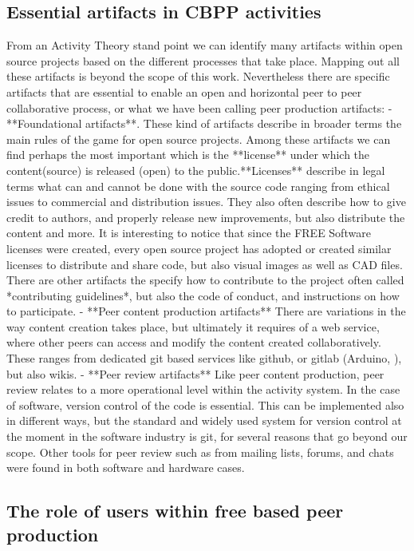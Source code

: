 \documentclass{ICED-Paper}%
\begin{document}
\subsection{Essential artifacts in CBPP activities}
From an Activity Theory stand point we can identify many artifacts within open source projects based on the different processes that take place. Mapping out all these artifacts is beyond the scope of this work. Nevertheless there are specific artifacts that are essential to enable an open and horizontal peer to peer collaborative process, or what we have been calling peer production artifacts:
- **Foundational artifacts**. These kind of artifacts describe in broader terms the main rules of the game for open source projects. Among these artifacts we can find perhaps the most important which is the **license** under which the content(source) is released (open) to the public.**Licenses** describe in legal terms what can and cannot be done with the source code ranging from ethical issues to commercial and distribution issues. They also often describe how to give credit to authors, and properly
release new improvements, but also distribute the content and more. It is interesting to notice that since the FREE Software licenses were created, every open source project has adopted or created similar licenses to distribute and share code, but also visual images as well as CAD files. There are other artifacts the specify how to contribute to the project often called *contributing guidelines*, but also the code of conduct, and instructions on how to participate.
- **Peer content production artifacts** There are variations in the way content creation takes place, but ultimately it requires of a web service, where other peers can access and modify the content created collaboratively. These ranges from dedicated git based services like github, or gitlab (Arduino, ), but also wikis.
- **Peer review artifacts** Like peer content production, peer review relates to a more operational level within the activity system. In the case of software, version control of the code is essential. This can be implemented also in different ways, but the standard and widely used system for version control at the moment in the software industry is git, for several reasons that go beyond our scope. Other tools for peer review such as from mailing lists, forums, and chats were found in both software and hardware cases.

\subsection{The role of users within free based peer production}
\end{document}
